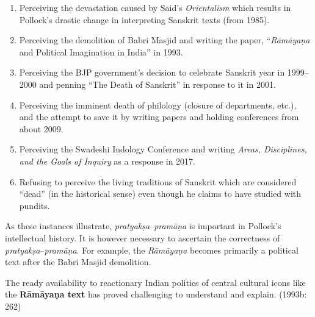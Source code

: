 \begin{enumerate}
\itemsep=0pt
\item Perceiving the devastation caused by Said’s \textit{Orientalism} which results in Pollock’s drastic change in interpreting Sanskrit texts (from 1985).

 \item Perceiving the demolition of Babri Masjid and writing the paper, “\textit{Rāmāyaṇa} and Political Imagination in India” in 1993.

 \item Perceiving the BJP government’s decision to celebrate Sanskrit year in 1999–2000 and penning “The Death of Sanskrit” in response to it in 2001.

 \item Perceiving the imminent death of philology (closure of departments, etc.), and the attempt to save it by writing papers and holding conferences from about 2009.

 \item Perceiving the Swadeshi Indology Conference and writing \textit{Areas, Disciplines, and the Goals of Inquiry} as a response in 2017.

 \item Refusing to perceive the living traditions of Sanskrit which are considered “dead” (in the historical sense) even though he claims to have studied with pundits.

\end{enumerate}

\vspace{-.3cm}

As these instances illustrate, \textit{pratyakṣa}–\textit{pramāṇa} is important in Pollock’s intellectual history. It is however necessary to ascertain the correctness of \textit{pratyakṣa}–\textit{pramāṇa}. For example, the \textit{Rāmāyaṇa} becomes primarily a political text after the Babri Masjid demolition.

\begin{myquote}
The ready availability to reactionary Indian politics of central cultural icons like the \textbf{Rāmāyaṇa text} has proved challenging to understand and explain. (1993b: 262)
\end{myquote}

